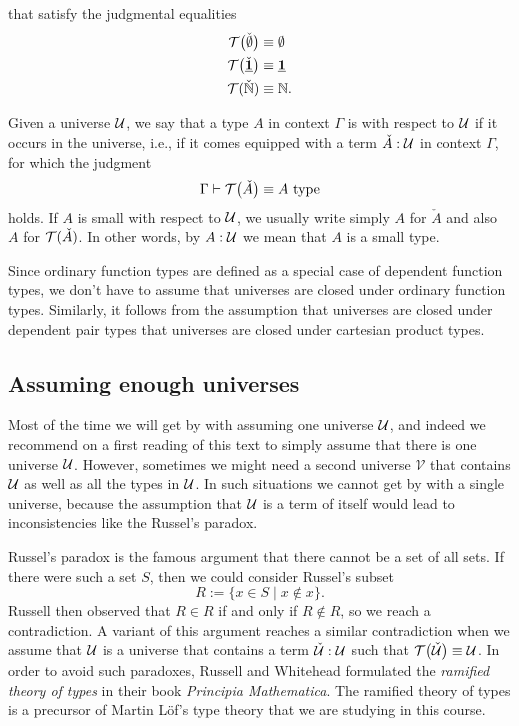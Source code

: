 \begin{defn}
\begin{enumerate}
    that satisfy the judgmental equalities
    \begin{align*}
      \mathcal{T}\big(\check{\emptyset}\big) & \equiv \emptyset \\
      \mathcal{T}\big(\check{\underline{\mathbf{1}}}\big) & \equiv \underline{\mathbf{1}} \\
      \mathcal{T}(\check{{\mathbb{N}}}) & \equiv {\mathbb{N}}.
    \end{align*}
  \end{enumerate}
  Given a universe $\mathcal{U}$, we say that a type $A$ in context $\Gamma$ is  with respect to $\mathcal{U}$ if it occurs in the universe, i.e., if it comes equipped with a term $\check{A}:\mathcal{U}$ in context $\Gamma$, for which the judgment
  \begin{equation*}
    \Gamma\vdash\mathcal{T}\big(\check{A}\big)\equiv A~\mathrm{type}
  \end{equation*}
  holds. If $A$ is small with respect to $\mathcal{U}$, we usually write simply $A$ for $\check{A}$ and also $A$ for $\mathcal{T}(\check{A})$. In other words, by $A:\mathcal{U}$ we mean that $A$ is a small type. 
\end{defn}

\begin{rmk}
  Since ordinary function types are defined as a special case of dependent function types, we don't have to assume that universes are closed under ordinary function types. Similarly, it follows from the assumption that universes are closed under dependent pair types that universes are closed under cartesian product types.
\end{rmk}

\subsection{Assuming enough universes}

  Most of the time we will get by with assuming one universe $\mathcal{U}$, and indeed we recommend on a first reading of this text to simply assume that there is one universe $\mathcal{U}$. However, sometimes we might need a second universe $\mathcal{V}$ that contains $\mathcal{U}$ as well as all the types in $\mathcal{U}$. In such situations we cannot get by with a single universe, because the assumption that $\mathcal{U}$ is a term of itself would lead to inconsistencies like the Russel's paradox.

  Russel's paradox is the famous argument that there cannot be a set of all sets. If there were such a set $S$, then we could consider Russel's subset
  \begin{equation*}
    R:=\{x\in S\mid x\notin x\}.
  \end{equation*}
  Russell then observed that $R\in R$ if and only if $R\notin R$, so we reach a contradiction. A variant of this argument reaches a similar contradiction when we assume that $\mathcal{U}$ is a universe that contains a term $\check{\mathcal{U}}:\mathcal{U}$ such that $\mathcal{T}\big(\check{\mathcal{U}}\big)\equiv \mathcal{U}$. In order to avoid such paradoxes, Russell and Whitehead formulated the \emph{ramified theory of types} in their book \emph{Principia Mathematica}. The ramified theory of types is a precursor of Martin L\"of's type theory that we are studying in this course.  

